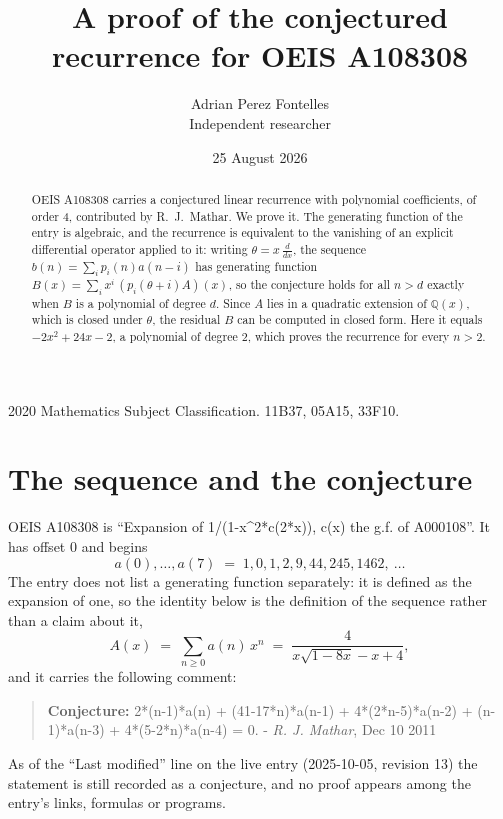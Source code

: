 \documentclass[11pt,a4paper]{article}
\title{A proof of the conjectured recurrence for OEIS A108308}
\author{Adrian Perez Fontelles\\ \small Independent researcher}
\date{25 August 2026}
\theoremstyle{plain}
\theoremstyle{definition}
\begin{document}
\maketitle

\begin{abstract}
OEIS A108308 carries a conjectured linear recurrence with polynomial coefficients, of
order 4, contributed by R.~J.~Mathar. We prove it. The generating function of the
entry is algebraic, and the recurrence is equivalent to the vanishing of an explicit
differential operator applied to it: writing $\theta=x\,\frac{d}{dx}$, the sequence
$b(n)=\sum_{i}p_{i}(n)a(n-i)$ has generating function
$B(x)=\sum_{i}x^{i}\,(p_{i}(\theta+i)A)(x)$, so the conjecture holds for all $n>d$ exactly
when $B$ is a polynomial of degree $d$. Since $A$ lies in a quadratic extension of
$\mathbb{Q}(x)$, which is closed under $\theta$, the residual $B$ can be computed in
closed form. Here it equals $- 2 x^{2} + 24 x - 2$, a polynomial of degree $2$, which proves
the recurrence for every $n>2$.
\end{abstract}

\noindent\small 2020 Mathematics Subject Classification. 11B37, 05A15, 33F10.\normalsize

\section{The sequence and the conjecture}

OEIS A108308 is ``Expansion of 1/(1-x\^{}2*c(2*x)), c(x) the g.f. of A000108''. It has offset $0$ and begins
\[
a(0),\dots,a(7)\;=\;1, 0, 1, 2, 9, 44, 245, 1462,\ \dots
\]
The entry does not list a generating function separately: it is defined as the
expansion of one, so the identity below is the definition of the sequence rather than a
claim about it,
\begin{equation}\label{eq:gf}
A(x)\;=\;\sum_{n\ge 0} a(n)\,x^{n}\;=\;\frac{4}{x \sqrt{1 - 8 x} - x + 4} ,
\end{equation}
and it carries the following comment:
\begin{quote}\small
\textbf{Conjecture:} 2*(n-1)*a(n) + (41-17*n)*a(n-1) + 4*(2*n-5)*a(n-2) + (n-1)*a(n-3) + 4*(5-2*n)*a(n-4) = 0. - \emph{R. J. Mathar}, Dec 10 2011
\end{quote}
As of the ``Last modified'' line on the live entry (2025-10-05, revision 13) the
statement is still recorded as a conjecture, and no proof appears among the entry's links,
formulas or programs.
\end{document}
